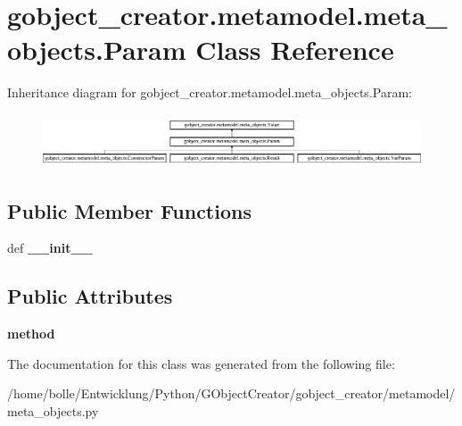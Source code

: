 \hypertarget{classgobject__creator_1_1metamodel_1_1meta__objects_1_1Param}{
\section{gobject\_\-creator.metamodel.meta\_\-objects.Param Class Reference}
\label{classgobject__creator_1_1metamodel_1_1meta__objects_1_1Param}
}
Inheritance diagram for gobject\_\-creator.metamodel.meta\_\-objects.Param:\begin{figure}[H]
\begin{center}
\leavevmode
\includegraphics[height=1.57746cm]{classgobject__creator_1_1metamodel_1_1meta__objects_1_1Param}
\end{center}
\end{figure}
\subsection*{Public Member Functions}
\begin{DoxyCompactItemize}
\item 
\hypertarget{classgobject__creator_1_1metamodel_1_1meta__objects_1_1Param_ac838ba34c1224056467dcd766d82eec3}{
def {\bfseries \_\-\_\-init\_\-\_\-}}
\label{classgobject__creator_1_1metamodel_1_1meta__objects_1_1Param_ac838ba34c1224056467dcd766d82eec3}

\end{DoxyCompactItemize}
\subsection*{Public Attributes}
\begin{DoxyCompactItemize}
\item 
\hypertarget{classgobject__creator_1_1metamodel_1_1meta__objects_1_1Param_a73889f26ed0d304fa95ffa2239b63f06}{
{\bfseries method}}
\label{classgobject__creator_1_1metamodel_1_1meta__objects_1_1Param_a73889f26ed0d304fa95ffa2239b63f06}

\end{DoxyCompactItemize}


The documentation for this class was generated from the following file:\begin{DoxyCompactItemize}
\item 
/home/bolle/Entwicklung/Python/GObjectCreator/gobject\_\-creator/metamodel/meta\_\-objects.py\end{DoxyCompactItemize}
